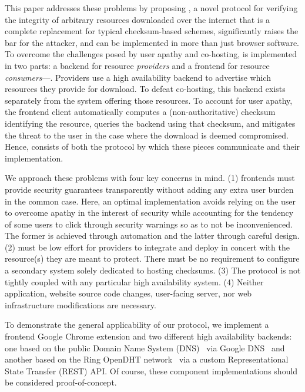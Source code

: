 This paper addresses these problems by proposing \SYSTEM{}, a novel protocol
for verifying the integrity of arbitrary resources downloaded over the internet
that is a complete replacement for typical checksum-based schemes, significantly
raises the bar for the attacker, and can be implemented in more than just
browser software. To overcome the challenges posed by user apathy and
co-hosting, \SYSTEM{} is implemented in two parts: a backend for resource
\emph{providers} and a frontend for resource \emph{consumers}---. Providers use a high availability backend to advertise which resources
they provide for download. To defeat co-hosting, this backend exists
separately from the system offering those resources. To account for user apathy,
the frontend client automatically computes a (non-authoritative) checksum
identifying the resource, queries the backend using that checksum, and mitigates
the threat to the user in the case where the download is deemed compromised.
Hence, \SYSTEM{} consists of both the protocol by which these pieces communicate and their implementation.

We approach these problems with four key concerns in mind. (1) \SYSTEM{}
frontends must provide security guarantees transparently without adding any
extra user burden in the common case. Here, an optimal implementation
avoids relying on the user to overcome apathy in the interest of security while
accounting for the tendency of some users to click through security warnings so
as to not be inconvenienced. The former is achieved through automation and the
latter through careful design. (2) \SYSTEM{} must be low effort for providers to
integrate and deploy in concert with the resource(s) they are meant to protect.
There must be no requirement to configure a secondary system solely dedicated to
hosting checksums. (3) The protocol is not tightly coupled with any particular
high availability system. (4) Neither application, website source code changes, 
user-facing server, nor web infrastructure modifications are necessary.

To demonstrate the general applicability of our protocol, we implement a
frontend Google Chrome extension and two different high availability backends:
one based on the public Domain Name System (DNS)~\cite{DNS1, DNS2} via Google
DNS~\cite{GoogleDNS} and another based on the Ring OpenDHT
network~\cite{OpenDHT, savoirfairelinux} via a custom Representational State
Transfer (REST) API. Of course, these \SYSTEM{} component implementations should
be considered proof-of-concept.

